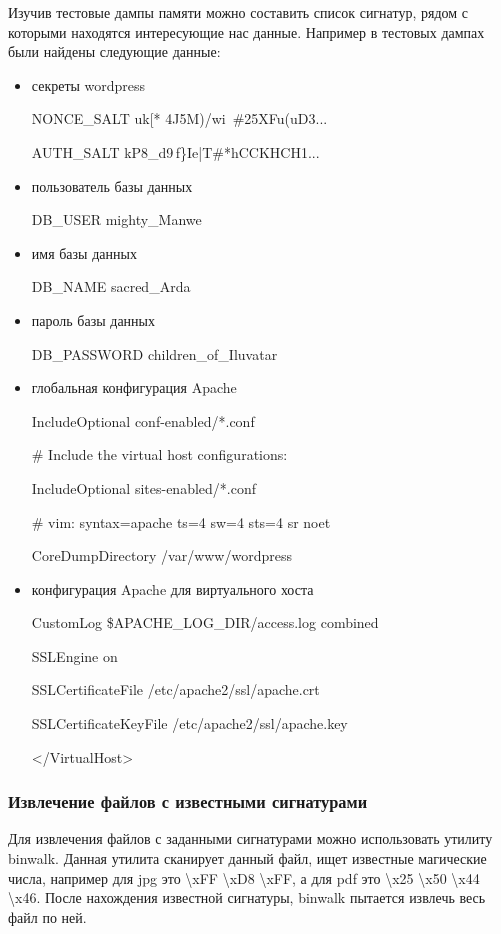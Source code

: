 \documentclass[20pt]{article}
\begin{document}
Изучив тестовые дампы памяти можно составить список сигнатур, рядом с которыми
находятся интересующие нас данные. Например в тестовых дампах были найдены следующие
данные:

\begin{itemize}
  \item секреты wordpress

  NONCE\_SALT uk[* 4J5M)/wi~\#25XFu(uD3...

  AUTH\_SALT kP8\_d9\,f\}Ie|T\#*hCCKHCH1...

  \item пользователь базы данных

  DB\_USER mighty\_Manwe

  \item имя базы данных

  DB\_NAME sacred\_Arda

  \item пароль базы данных

  DB\_PASSWORD children\_of\_Iluvatar

  \item глобальная конфигурация Apache

  IncludeOptional conf-enabled/*.conf

  \# Include the virtual host configurations:

  IncludeOptional sites-enabled/*.conf

  \# vim: syntax=apache ts=4 sw=4 sts=4 sr noet

  CoreDumpDirectory /var/www/wordpress

  \item конфигурация Apache для виртуального хоста

  CustomLog \${APACHE\_LOG\_DIR}/access.log combined

  SSLEngine on

  SSLCertificateFile /etc/apache2/ssl/apache.crt

  SSLCertificateKeyFile /etc/apache2/ssl/apache.key

  </VirtualHost>

\end{itemize}

\subsubsection{Извлечение файлов с известными сигнатурами}

Для извлечения файлов с заданными сигнатурами можно использовать утилиту
binwalk\cite{binwalk}. Данная утилита сканирует данный файл, ищет известные
магические числа\cite{signatures}, например для jpg это \textbackslash xFF \textbackslash xD8 \textbackslash xFF,
а для pdf это \textbackslash x25 \textbackslash x50 \textbackslash x44 \textbackslash x46. После нахождения известной сигнатуры,
binwalk пытается извлечь весь файл по ней.
\end{document}
